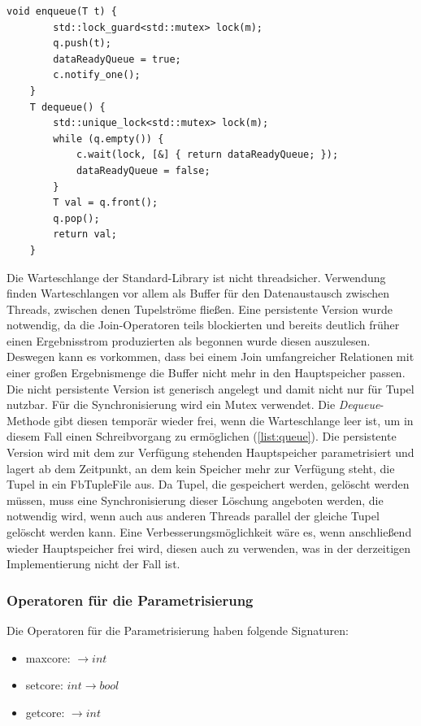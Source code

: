 \documentclass[a4paper,12pt,twoside]{article}
\newcommand{\Fb}[1]{\textit{#1}} %
\begin{document}
\begin{minipage}{0.95\textwidth}
	\begin{lstlisting}[caption={Enqueue und Dequeue-Methode der threadsicheren Warteschlange.}, label=list:queue]
	void enqueue(T t) {
		std::lock_guard<std::mutex> lock(m);
		q.push(t);
		dataReadyQueue = true;
		c.notify_one();
	}
	T dequeue() {
		std::unique_lock<std::mutex> lock(m);
		while (q.empty()) {
			c.wait(lock, [&] { return dataReadyQueue; });
			dataReadyQueue = false;
		}
		T val = q.front();
		q.pop();
		return val;
	}
	\end{lstlisting}
\end{minipage}

Die Warteschlange der Standard-Library ist nicht threadsicher. Verwendung finden Warteschlangen vor allem als Buffer für den Datenaustausch zwischen Threads, zwischen denen Tupelströme fließen. Eine persistente Version wurde notwendig, da die Join-Operatoren teils blockierten und bereits deutlich früher einen Ergebnisstrom produzierten als begonnen wurde diesen auszulesen. Deswegen kann es vorkommen, dass bei einem Join umfangreicher Relationen mit einer großen Ergebnismenge die Buffer nicht mehr in den Hauptspeicher passen. Die nicht persistente Version ist generisch angelegt und damit nicht nur für Tupel nutzbar. Für die Synchronisierung wird ein Mutex verwendet. Die \Fb{Dequeue}-Methode gibt diesen temporär wieder frei, wenn die Warteschlange leer ist, um in diesem Fall einen Schreibvorgang zu ermöglichen (\autoref{list:queue}). Die persistente Version wird mit dem zur Verfügung stehenden Hauptspeicher parametrisiert und lagert ab dem Zeitpunkt, an dem kein Speicher mehr zur Verfügung steht, die Tupel in ein Fb{TupleFile} aus. Da Tupel, die gespeichert werden, gelöscht werden müssen, muss eine Synchronisierung dieser Löschung angeboten werden, die notwendig wird, wenn auch aus anderen Threads parallel der gleiche Tupel gelöscht werden kann. Eine Verbesserungsmöglichkeit wäre es, wenn anschließend wieder Hauptspeicher frei wird, diesen auch zu verwenden, was in der derzeitigen Implementierung nicht der Fall ist.

\subsubsection{Operatoren für die Parametrisierung}

Die Operatoren für die Parametrisierung haben folgende Signaturen:

\begin{itemize}
	\item maxcore: $\longrightarrow int$
	\item setcore: $int \longrightarrow bool$
	\item getcore: $\longrightarrow int$
\end{itemize}
\end{document}
